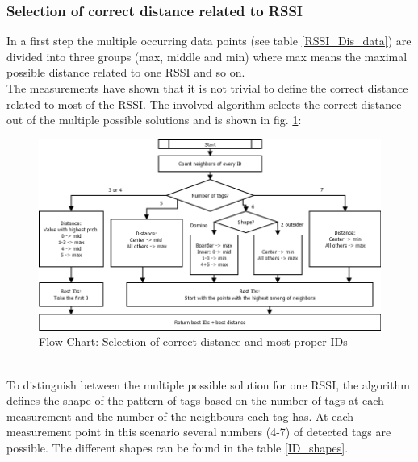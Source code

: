\subsubsection{Selection of correct distance related to RSSI}
In a first step the multiple occurring data points (see table \ref{RSSI_Dis_data}) are divided into three groups (max, middle and min) where max means the maximal possible distance related to one RSSI and so on.\\ 
The measurements have shown that it is not trivial to define the correct distance related to most of the RSSI. The involved algorithm selects the correct distance out of the multiple possible solutions and is shown in fig. \ref{BestID}:\\
\begin{figure}[!htbp]
\centering
\includegraphics[width = 16cm]{Pictures/BestIDs}
\caption{Flow Chart: Selection of correct distance and most proper IDs}
\label{BestID}
\end{figure}\\
To distinguish between the multiple possible solution for one RSSI, the algorithm defines the shape of the pattern of tags based on the number of tags at each measurement and the number of the neighbours each tag has. At each measurement point in this scenario several numbers (4-7) of detected tags are possible. The different shapes can be found in the table \ref{ID_shapes}.\\
